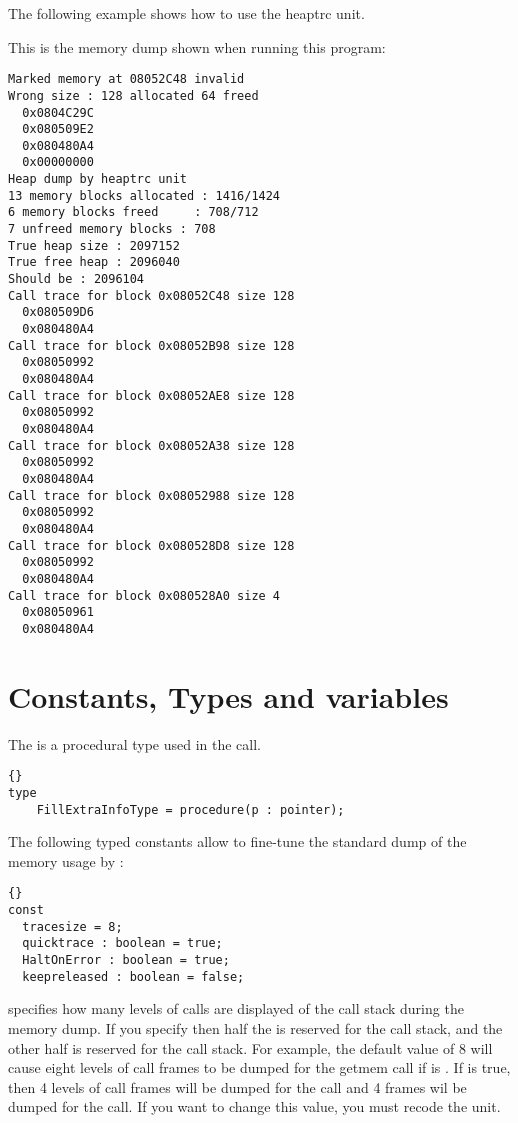 The following example shows how to use the heaptrc unit.

\latex{}
\html{}

This is the memory dump shown when running this program:
\begin{verbatim}
Marked memory at 08052C48 invalid
Wrong size : 128 allocated 64 freed
  0x0804C29C
  0x080509E2
  0x080480A4
  0x00000000
Heap dump by heaptrc unit
13 memory blocks allocated : 1416/1424
6 memory blocks freed     : 708/712
7 unfreed memory blocks : 708
True heap size : 2097152
True free heap : 2096040
Should be : 2096104
Call trace for block 0x08052C48 size 128
  0x080509D6
  0x080480A4
Call trace for block 0x08052B98 size 128
  0x08050992
  0x080480A4
Call trace for block 0x08052AE8 size 128
  0x08050992
  0x080480A4
Call trace for block 0x08052A38 size 128
  0x08050992
  0x080480A4
Call trace for block 0x08052988 size 128
  0x08050992
  0x080480A4
Call trace for block 0x080528D8 size 128
  0x08050992
  0x080480A4
Call trace for block 0x080528A0 size 4
  0x08050961
  0x080480A4
\end{verbatim}

\section{Constants, Types and variables}

The  is a procedural type used in the
 call.

\begin{lstlisting}{}
type
    FillExtraInfoType = procedure(p : pointer);
\end{lstlisting}{}
The following typed constants allow to fine-tune the standard dump of the
memory usage by :

\begin{lstlisting}{}
const
  tracesize = 8;
  quicktrace : boolean = true;
  HaltOnError : boolean = true;
  keepreleased : boolean = false;
\end{lstlisting}{}

 specifies how many levels of calls are displayed of the 
call stack during the memory dump. If you specify 
then half the  is reserved for the  call stack, 
and the other half is reserved for the  call stack.
For example, the default value of 8 will cause eight levels of call frames
to be dumped for the getmem call if  is . If
 is true, then 4 levels of call frames will be dumped for
the  call and 4 frames wil be dumped for the  call.
If you want to change this value, you must recode the  unit.


